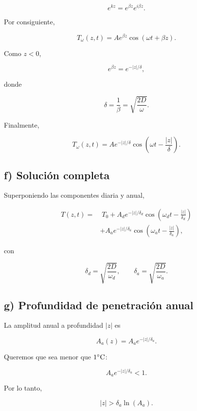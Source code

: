 \documentclass[11pt,spanish]{article}
\begin{document}
\[
e^{kz}
=
e^{\beta z}
e^{i\beta z}.
\]

Por consiguiente,

\[
T_\omega(z,t)
=
A e^{\beta z}
\cos(\omega t+\beta z).
\]

Como \(z<0\),

\[
e^{\beta z}
=
e^{-|z|/\delta},
\]

donde

\[
\boxed{
\delta
=
\frac1\beta
=
\sqrt{\frac{2D}{\omega}}.
}
\]

Finalmente,

\[
\boxed{
T_\omega(z,t)
=
A
e^{-|z|/\delta}
\cos
\left(
\omega t
-
\frac{|z|}{\delta}
\right).
}
\]


\subsection*{f) Solución completa}

Superponiendo las componentes diaria y anual,

\[
\boxed{
\begin{aligned}
T(z,t)
=&\;
T_0
+
A_d
e^{-|z|/\delta_d}
\cos
\left(
\omega_d t
-
\frac{|z|}{\delta_d}
\right)
\\[1ex]
&
+
A_a
e^{-|z|/\delta_a}
\cos
\left(
\omega_a t
-
\frac{|z|}{\delta_a}
\right),
\end{aligned}
}
\]

con

\[
\delta_d
=
\sqrt{\frac{2D}{\omega_d}},
\qquad
\delta_a
=
\sqrt{\frac{2D}{\omega_a}}.
\]


\subsection*{g) Profundidad de penetración anual}

La amplitud anual a profundidad \(|z|\) es

\[
A_a(z)
=
A_a
e^{-|z|/\delta_a}.
\]

Queremos que sea menor que \(1^\circ{\rm C}\):

\[
A_a e^{-|z|/\delta_a}<1.
\]

Por lo tanto,

\[
|z|
>
\delta_a \ln(A_a).
\]

\end{document}
